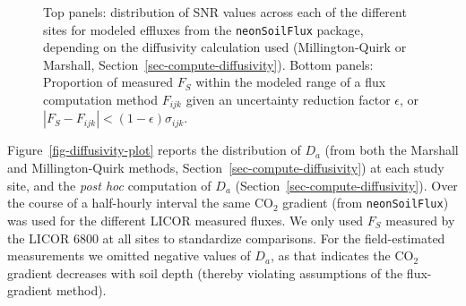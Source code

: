\documentclass[
  letterpaper,
  DIV=11,
  numbers=noendperiod]{scrartcl}
\begin{document}
\begin{figure}


\caption{\label{fig-uncertainty-stats}Top panels: distribution of SNR
values across each of the different sites for modeled effluxes from the
\texttt{neonSoilFlux} package, depending on the diffusivity calculation
used (Millington-Quirk or Marshall,
Section~\ref{sec-compute-diffusivity}). Bottom panels: Proportion of
measured \(F_{S}\) within the modeled range of a flux computation method
\(F_{ijk}\) given an uncertainty reduction factor \(\epsilon\), or
\(| F_{S} - F_{ijk} | < (1-\epsilon) \sigma_{ijk}\).}

\end{figure}%

Figure~\ref{fig-diffusivity-plot} reports the distribution of \(D_{a}\)
(from both the Marshall and Millington-Quirk methods,
Section~\ref{sec-compute-diffusivity}) at each study site, and the
\emph{post hoc} computation of \(D_{a}\)
(Section~\ref{sec-compute-diffusivity}). Over the course of a
half-hourly interval the same CO\(_{2}\) gradient (from
\texttt{neonSoilFlux}) was used for the different LICOR measured fluxes.
We only used \(F_{S}\) measured by the LICOR 6800 at all sites to
standardize comparisons. For the field-estimated measurements we omitted
negative values of \(D_{a}\), as that indicates the CO\(_{2}\) gradient
decreases with soil depth (thereby violating assumptions of the
flux-gradient method).
\end{document}
